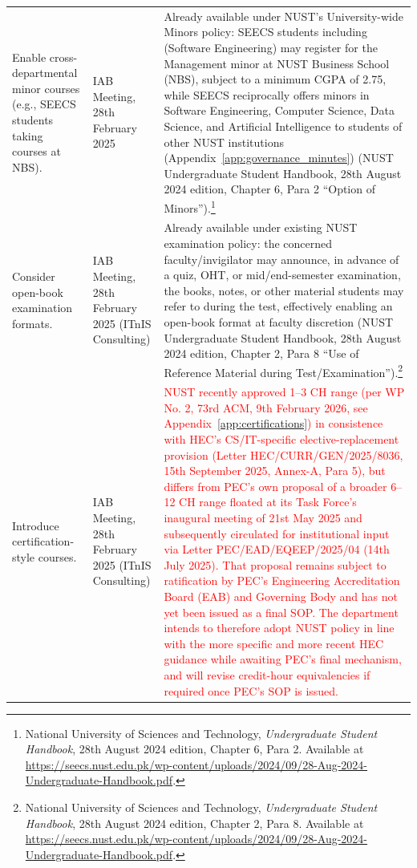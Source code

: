 \begin{longtable}[]{@{}>{\raggedright\arraybackslash}p{}>{\raggedright\arraybackslash}p{}>{\raggedright\arraybackslash}p{}@{}}
\addlinespace
Enable cross-departmental minor courses (e.g., SEECS students taking courses at NBS). & IAB Meeting, 28th February 2025 & Already available under NUST's University-wide Minors policy: SEECS students including (Software Engineering) may register for the Management minor at NUST Business School (NBS), subject to a minimum CGPA of 2.75, while SEECS reciprocally offers minors in Software Engineering, Computer Science, Data Science, and Artificial Intelligence to students of other NUST institutions (Appendix~\ref{app:governance_minutes}) (NUST Undergraduate Student Handbook, 28th August 2024 edition, Chapter 6, Para 2 ``Option of Minors'').\footnote{National University of Sciences and Technology, \textit{Undergraduate Student Handbook}, 28th August 2024 edition, Chapter 6, Para 2. Available at \url{https://seecs.nust.edu.pk/wp-content/uploads/2024/09/28-Aug-2024-Undergraduate-Handbook.pdf}.}\\
\addlinespace
Consider open-book examination formats. & IAB Meeting, 28th February 2025 (ITnIS Consulting) & Already available under existing NUST examination policy: the concerned faculty/invigilator may announce, in advance of a quiz, OHT, or mid/end-semester examination, the books, notes, or other material students may refer to during the test, effectively enabling an open-book format at faculty discretion (NUST Undergraduate Student Handbook, 28th August 2024 edition, Chapter 2, Para 8 ``Use of Reference Material during Test/Examination'').\footnote{National University of Sciences and Technology, \textit{Undergraduate Student Handbook}, 28th August 2024 edition, Chapter 2, Para 8. Available at \url{https://seecs.nust.edu.pk/wp-content/uploads/2024/09/28-Aug-2024-Undergraduate-Handbook.pdf}.}\\
\addlinespace
Introduce certification-style courses. & IAB Meeting, 28th February 2025 (ITnIS Consulting) & \textcolor{red}{NUST recently approved 1–3 CH range (per WP No. 2, 73rd ACM, 9th February 2026, see Appendix~\ref{app:certifications}) in consistence with HEC's CS/IT-specific elective-replacement provision (Letter HEC/CURR/GEN/2025/8036, 15th September 2025, Annex-A, Para 5), but differs from PEC's own proposal of a broader 6–12 CH range floated at its Task Force's inaugural meeting of 21st May 2025 and subsequently circulated for institutional input via Letter PEC/EAD/EQEEP/2025/04 (14th July 2025). That proposal remains subject to ratification by PEC's Engineering Accreditation Board (EAB) and Governing Body and has not yet been issued as a final SOP. The department intends to therefore adopt NUST policy in line with the more specific and more recent HEC guidance while awaiting PEC's final mechanism, and will revise credit-hour equivalencies if required once PEC's SOP is issued.}\\
\end{longtable}
\endgroup

